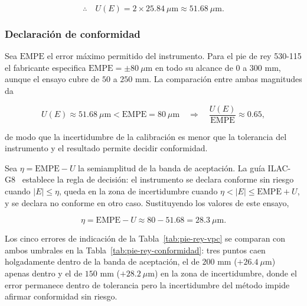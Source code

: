 \begin{equation}
    \therefore\quad U(E) = 2 \times 25.84\ \mu\text{m} \approx 51.68\ \mu\text{m}.
    \label{eq:U-num-valor}
\end{equation}

\subsubsection{Declaración de conformidad}

Sea $\text{EMPE}$ el error máximo permitido del instrumento. Para el pie de rey
530-115 el fabricante especifica $\text{EMPE} = \pm 80\ \mu\text{m}$
\parencite{mitutoyo_catalogo} en todo su
alcance de $0$ a $300$ mm, aunque el ensayo cubre de $50$ a $250$ mm. La comparación
entre ambas magnitudes da

\begin{equation}
    U(E) \approx 51.68\ \mu\text{m} < \text{EMPE} = 80\ \mu\text{m}
    \quad\Longrightarrow\quad
    \frac{U(E)}{\text{EMPE}} \approx 0.65,
    \label{eq:conformidad}
\end{equation}

de modo que la incertidumbre de la calibración es menor que la tolerancia del
instrumento y el resultado permite decidir conformidad.

Sea $\eta = \text{EMPE} - U$ la semiamplitud de la banda de aceptación. La guía
ILAC-G8~\cite{ilac2019decision} establece la regla de decisión: el instrumento se
declara conforme sin riesgo cuando $|E| \le \eta$, queda en la zona de incertidumbre
cuando $\eta < |E| \le \text{EMPE} + U$, y se declara no conforme en otro caso.
Sustituyendo los valores de este ensayo,

\begin{equation}
    \eta = \text{EMPE} - U \approx 80 - 51.68 = 28.3\ \mu\text{m}.
    \label{eq:banda-aceptacion}
\end{equation}

Los cinco errores de indicación de la Tabla~\ref{tab:pie-rey-vpc} se comparan con
ambos umbrales en la Tabla~\ref{tab:pie-rey-conformidad}: tres puntos caen
holgadamente dentro de la banda de aceptación, el de $200$ mm
($+26.4\ \mu\text{m}$) apenas dentro y el de $150$ mm ($+28.2\ \mu\text{m}$) en la
zona de incertidumbre, donde el error permanece dentro de tolerancia pero la
incertidumbre del método impide afirmar conformidad sin riesgo.


